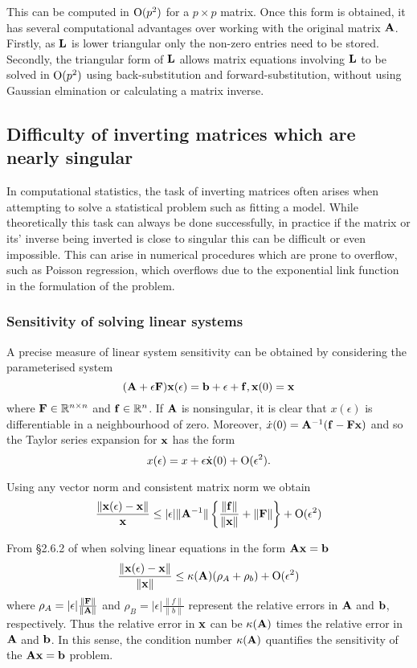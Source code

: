 \documentclass{amsart}[12pt]
\begin{document}
This can be computed in $\text{O}(p^2)$ for a $p \times p$ matrix. Once this form is obtained, it has several
computational advantages over working with the original matrix ${\bf A}$. Firstly, as ${\bf L}$ is lower triangular
only the non-zero entries need to be stored. Secondly, the triangular form of ${\bf L}$ allows matrix equations
involving ${\bf L}$ to be solved in $\text{O}{(p^2)}$ using back-substitution and forward-substitution, without using
Gaussian elmination or calculating a matrix inverse.

\subsection{Difficulty of inverting matrices which are nearly singular}
In computational statistics, the task of inverting matrices often arises when
attempting to solve a statistical problem such as fitting a model. While theoretically this task can always be
done successfully, in practice if the matrix or its' inverse being inverted is close to singular this can be
difficult or even impossible. This can arise in numerical procedures which are prone to overflow, such as
Poisson regression, which overflows due to the exponential link function in the formulation of the problem.

\subsubsection{Sensitivity of solving linear systems}

A precise measure of linear system sensitivity can be obtained by considering the parameterised system
\[
	({\bf A} + \epsilon {\bf F}) {\bf x}(\epsilon) = {\bf b} + \epsilon + {\bf f},  {\bf x}(0) = {\bf x}
\]
where ${\bf F} \in {\mathbb{R}}^{n \times n}$ and ${\bf f} \in {\mathbb{R}}^n$. If ${\bf A}$ is nonsingular, it is clear that $x(\epsilon)$ is
differentiable in a neighbourhood of zero. Moreover, $\dot{x}(0) = {\bf A}^{-1} ({\bf f} - {\bf F} {\bf x})$ and so the
Taylor series expansion for ${\bf x}$ has the form
\[
	x(\epsilon) = x + \epsilon \dot{{\bf x}}(0) + \text{O}(\epsilon^2).
\]

Using any vector norm and consistent matrix norm we obtain
\[
	\frac{\|{\bf x}(\epsilon) - {\bf x}\|}{{\bf x}} \leq |\epsilon| \|{\bf A}^{-1}\| \left\{\frac{\|{\bf f}\|}{\|{\bf x}\|} + \|{\bf F}\|\right\} + \text{O}(\epsilon^2)
\]

From \S 2.6.2 of \citep{Golub:1996:MC:248979}
when solving linear equations in the form ${\bf A} {\bf x} = {\bf b}$
\[
	\frac{\|{\bf x}(\epsilon) - {\bf x}\|}{\|{\bf x}\|} \leq \kappa({\bf A}) (\rho_A + \rho_b) + \text{O}(\epsilon^2)
\]
where $\rho_A = |\epsilon| \frac{\|{\bf F}\|}{\|{\bf A}\|}$ and $\rho_B = |\epsilon| \frac{\|f\|}{\|b\|}$ represent
the relative errors in ${\bf A}$ and ${\bf b}$, respectively. Thus the relative error in ${\bf x}$ can be $\kappa({\bf A})$
times the relative error in ${\bf A}$ and ${\bf b}$. In this sense, the condition number $\kappa({\bf A})$ quantifies the
sensitivity of the ${\bf A} {\bf x} = {\bf b}$ problem.
\end{document}
